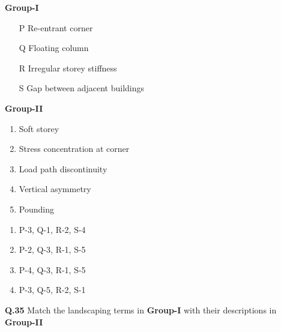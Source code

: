 \documentclass[journal,12pt,onecolumn]{IEEEtran}
\theoremstyle{remark}
\begin{document}
\begin{multicols}{2}
\noindent \hspace{2cm} \textbf  {Group-I}
\begin{enumerate}[label=\Alph*., leftmargin=1.5cm]
    \item[P] Re-entrant corner
    \item[Q] Floating column
    \item[R] Irregular storey stiffness
    \item[S] Gap between adjacent buildings
\end{enumerate}

\columnbreak

\noindent\hspace{1cm} \textbf{Group-II}
\begin{enumerate}[label=\arabic*., leftmargin=1.5cm]
    \item Soft storey
    \item Stress concentration at corner
    \item Load path discontinuity
    \item Vertical asymmetry
    \item Pounding
\end{enumerate}
\end{multicols}

\begin{multicols}{2}
\begin{enumerate}[label=(\Alph*) , leftmargin=1.5cm]
    \item P-3, Q-1, R-2, S-4
    \item P-2, Q-3, R-1, S-5
    \item P-4, Q-3, R-1, S-5
    \item P-3, Q-5, R-2, S-1
\end{enumerate}
\end{multicols}

\noindent\textbf{Q.35} Match the landscaping terms in \textbf{Group-I} with their descriptions in \textbf{Group-II}
\end{document}
